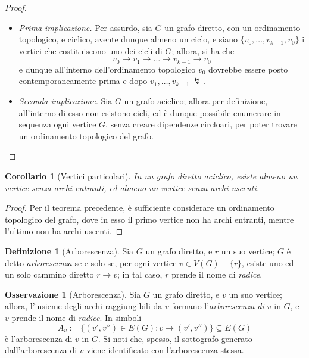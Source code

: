 \documentclass[14pt]{extreport}
\newtheorem{corollary}{Corollario}[subsection]
\theoremstyle{definition}
\newtheorem{definition}{Definizione}[subsection]
\theoremstyle{definition}
\newtheorem{remark}{Osservazione}[subsection]
\begin{document}
\begin{proof}
    \hspace{0.7cm}
    \begin{itemize}
        \item[] \textit{Prima implicazione.} Per assurdo, sia $G$ un grafo diretto, con un ordinamento topologico, e ciclico, avente dunque almeno un ciclo, e siano $\{v_0, \ldots , v_{k - 1}, v_0\}$ i vertici che costituiscono uno dei cicli di $G$; allora, si ha che $$v_0 \rightarrow v_1 \rightarrow \ldots \rightarrow v_{k - 1} \rightarrow v_0$$ e dunque all'interno dell'ordinamento topologico $v_0$ dovrebbe essere posto contemporaneamente prima e dopo $v_1, \ldots, v_{k - 1} \ \lightning$.
        \item[] \textit{Seconda implicazione.} Sia $G$ un grafo aciclico; allora per definizione, all'interno di esso non esistono cicli, ed è dunque possibile enumerare in sequenza ogni vertice $G$, senza creare dipendenze circloari, per poter trovare un ordinamento topologico del grafo.
    \end{itemize}
\end{proof}

\begin{corollary}[Vertici particolari]
    \label{vertici particolari}
    In un grafo diretto aciclico, esiste almeno un vertice senza archi entranti, ed almeno un vertice senza archi uscenti.
\end{corollary}

\begin{proof}
    Per il teorema precedente, è sufficiente considerare un ordinamento topologico del grafo, dove in esso il primo vertice non ha archi entranti, mentre l'ultimo non ha archi uscenti.
\end{proof}

\begin{definition}[Arborescenza]
    Sia $G$ un grafo diretto, e $r$ un suo vertice; $G$ è detto \textit{arborescenza} se e solo se, per ogni vertice $v \in V(G) - \{r\}$, esiste uno ed un solo cammino diretto $r \rightarrow v$; in tal caso, $r$ prende il nome di \textit{radice}.
\end{definition}

\begin{remark}[Arborescenza]
    Sia $G$ un grafo diretto, e $v$ un suo vertice; allora, l'insieme degli archi raggiungibili da $v$ formano l'\textit{arborescenza di $v$} in $G$, e $v$ prende il nome di \textit{radice}. In simboli $$A_v := \{(v', v'') \in E(G) : v \rightarrow (v', v'')\} \subseteq E(G)$$ è l'arborescenza di $v$ in $G$. Si noti che, spesso, il sottografo generato dall'arborescenza di $v$ viene identificato con l'arborescenza stessa.
\end{remark}
\end{document}
